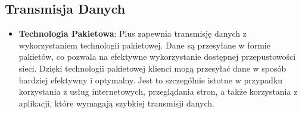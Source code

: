 \subsection{Transmisja Danych}
\begin{itemize}
    \item \textbf{Technologia Pakietowa}: Plus zapewnia transmisję danych z wykorzystaniem technologii pakietowej. Dane są przesyłane w formie pakietów, co pozwala na efektywne wykorzystanie dostępnej przepustowości sieci. Dzięki technologii pakietowej klienci mogą przesyłać dane w sposób bardziej efektywny i optymalny. Jest to szczególnie istotne w przypadku korzystania z usług internetowych, przeglądania stron, a także korzystania z aplikacji, które wymagają szybkiej transmisji danych.

\end{itemize}
